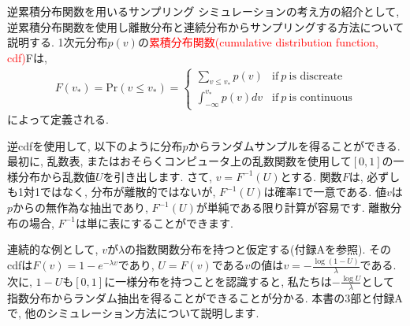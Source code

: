 \documentclass[10pt,dvipdfmx,a4]{beamer}
\newcommand{\eqn}[1]{\begin{align*}#1\end{align*}}
\newcommand{\tcr}[1]{\textcolor{red}{#1}}
\begin{document}

\begin{frame}{逆累積分布関数を用いるサンプリング}
シミュレーションの考え方の紹介として, 逆累積分布関数を使用し離散分布と連続分布からサンプリングする方法について説明する.
1次元分布$p(v)$の\tcr{累積分布関数(cumulative distribution function, cdf)}Fは,
\eqn{F(v_*)=\text{Pr}(v\leq v_*)
=\begin{cases}
\sum_{v\leq v_*} p(v) &\text{if}\ p\ \text{is discreate}\\
\int_{-\infty}^{v_*} p(v)dv &\text{if}\ p\ \text{is continuous}
\end{cases}}
によって定義される.

逆cdfを使用して, 以下のように分布$p$からランダムサンプルを得ることができる.
最初に, 乱数表, またはおそらくコンピュータ上の乱数関数を使用して$[0,1]$の一様分布から乱数値$U$を引き出します.
さて, $v=F^{-1}(U)$とする.
関数$F$は, 必ずしも1対1ではなく, 分布が離散的ではないが, $F^{-1}(U)$は確率1で一意である.
値$v$は$p$からの無作為な抽出であり, $F^{-1}(U)$が単純である限り計算が容易です.
離散分布の場合, $F^{-1}$は単に表にすることができます.
\end{frame}


\begin{frame}
連続的な例として, $v$が$\lambda$の指数関数分布を持つと仮定する(付録Aを参照).
そのcdfは$F(v)=1-e^{-\lambda v}$であり, $U=F(v)$である$v$の値は$v=-\frac{\log(1-U)}{\lambda}$である.
次に, $1-U$も$[0, 1]$に一様分布を持つことを認識すると, 私たちは$-\frac{\log U}{\lambda}$として指数分布からランダム抽出を得ることができることが分かる.
本書の3部と付録Aで, 他のシミュレーション方法について説明します.
\end{frame}

\end{document}
